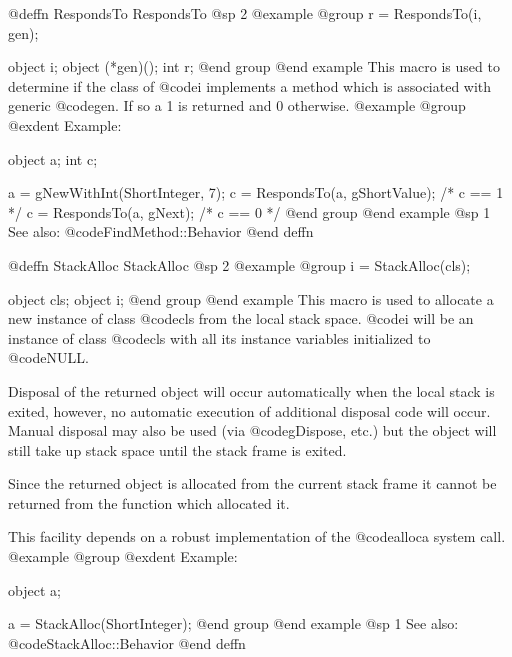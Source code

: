 {{{{@deffn {RespondsTo} RespondsTo
@sp 2
@example
@group
r = RespondsTo(i, gen);

object  i;
object  (*gen)();
int     r;
@end group
@end example
This macro is used to determine if the class of @code{i} implements a
method which is associated with generic @code{gen}.  If so a 1 is
returned and 0 otherwise.
@example
@group
@exdent Example:

object  a;
int     c;

a = gNewWithInt(ShortInteger, 7);
c = RespondsTo(a, gShortValue);  /* c == 1  */
c = RespondsTo(a, gNext);        /* c == 0  */
@end group
@end example
@sp 1
See also:  @code{FindMethod::Behavior}
@end deffn


















@deffn {StackAlloc} StackAlloc
@sp 2
@example
@group
i = StackAlloc(cls);

object  cls;
object  i;
@end group
@end example
This macro is used to allocate a new instance of class @code{cls} from
the local stack space.  @code{i} will be an instance of class @code{cls}
with all its instance variables initialized to @code{NULL}.

Disposal of the returned object will occur automatically when the local
stack is exited, however, no automatic execution of additional disposal
code will occur.  Manual disposal may also be used (via @code{gDispose},
etc.) but the object will still take up stack space until the stack
frame is exited.

Since the returned object is allocated from the current stack frame
it cannot be returned from the function which allocated it.

This facility depends on a robust implementation of the @code{alloca}
system call.
@example
@group
@exdent Example:

object  a;

a = StackAlloc(ShortInteger);
@end group
@end example
@sp 1
See also:  @code{StackAlloc::Behavior}
@end deffn





























}}}}
